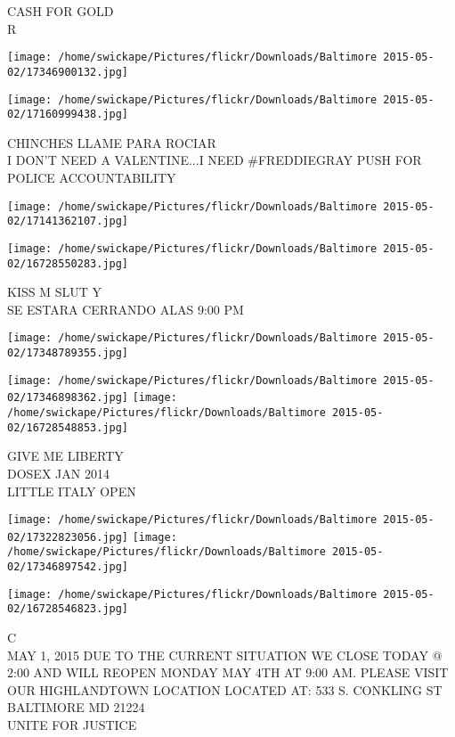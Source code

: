 \documentclass[10pt,letterpaper]{article}
\begin{document}
CASH FOR GOLD\\
R
\pagebreak

\texttt{[image: /home/swickape/Pictures/flickr/Downloads/Baltimore 2015-05-02/17346900132.jpg]}

\vspace{0.25in}
\texttt{[image: /home/swickape/Pictures/flickr/Downloads/Baltimore 2015-05-02/17160999438.jpg]}

CHINCHES LLAME PARA ROCIAR\\
I DON'T NEED A VALENTINE...I NEED \#FREDDIEGRAY PUSH FOR POLICE ACCOUNTABILITY
\pagebreak

\texttt{[image: /home/swickape/Pictures/flickr/Downloads/Baltimore 2015-05-02/17141362107.jpg]}

\vspace{0.25in}
\texttt{[image: /home/swickape/Pictures/flickr/Downloads/Baltimore 2015-05-02/16728550283.jpg]}

KISS M SLUT Y\\
SE ESTARA CERRANDO ALAS 9:00 PM
\pagebreak

\texttt{[image: /home/swickape/Pictures/flickr/Downloads/Baltimore 2015-05-02/17348789355.jpg]}

\vspace{0.25in}
\texttt{[image: /home/swickape/Pictures/flickr/Downloads/Baltimore 2015-05-02/17346898362.jpg]}
\texttt{[image: /home/swickape/Pictures/flickr/Downloads/Baltimore 2015-05-02/16728548853.jpg]}

GIVE ME LIBERTY\\
DOSEX JAN 2014\\
LITTLE ITALY OPEN
\pagebreak

\texttt{[image: /home/swickape/Pictures/flickr/Downloads/Baltimore 2015-05-02/17322823056.jpg]}
\texttt{[image: /home/swickape/Pictures/flickr/Downloads/Baltimore 2015-05-02/17346897542.jpg]}

\texttt{[image: /home/swickape/Pictures/flickr/Downloads/Baltimore 2015-05-02/16728546823.jpg]}

C\\
MAY 1, 2015  DUE TO THE CURRENT SITUATION WE CLOSE TODAY @ 2:00 AND WILL REOPEN MONDAY MAY 4TH AT 9:00 AM.  PLEASE VISIT OUR HIGHLANDTOWN LOCATION LOCATED AT: 533 S. CONKLING ST BALTIMORE MD 21224\\
UNITE FOR JUSTICE
\pagebreak
\end{document}
